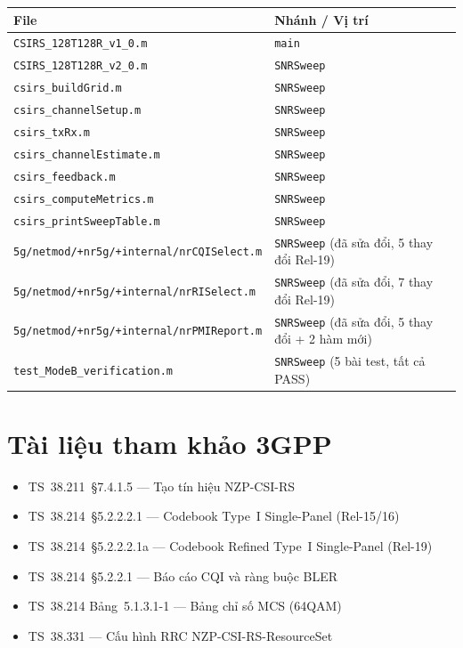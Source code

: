 \documentclass[11pt,a4paper]{article}
\begin{document}
\begin{tabular}{ll}
\toprule
\textbf{File} & \textbf{Nhánh / Vị trí} \\
\midrule
\texttt{CSIRS\_128T128R\_v1\_0.m}              & \texttt{main} \\
\texttt{CSIRS\_128T128R\_v2\_0.m}              & \texttt{SNRSweep} \\
\texttt{csirs\_buildGrid.m}                    & \texttt{SNRSweep} \\
\texttt{csirs\_channelSetup.m}                 & \texttt{SNRSweep} \\
\texttt{csirs\_txRx.m}                         & \texttt{SNRSweep} \\
\texttt{csirs\_channelEstimate.m}              & \texttt{SNRSweep} \\
\texttt{csirs\_feedback.m}                     & \texttt{SNRSweep} \\
\texttt{csirs\_computeMetrics.m}               & \texttt{SNRSweep} \\
\texttt{csirs\_printSweepTable.m}              & \texttt{SNRSweep} \\
\texttt{5g/netmod/+nr5g/+internal/nrCQISelect.m} & \texttt{SNRSweep} (đã sửa đổi, 5 thay đổi Rel-19) \\
\texttt{5g/netmod/+nr5g/+internal/nrRISelect.m} & \texttt{SNRSweep} (đã sửa đổi, 7 thay đổi Rel-19) \\
\texttt{5g/netmod/+nr5g/+internal/nrPMIReport.m} & \texttt{SNRSweep} (đã sửa đổi, 5 thay đổi + 2 hàm mới) \\
\texttt{test\_ModeB\_verification.m} & \texttt{SNRSweep} (5 bài test, tất cả PASS) \\
\bottomrule
\end{tabular}

\section{Tài liệu tham khảo 3GPP}

\begin{itemize}[noitemsep]
    \item TS~38.211~§7.4.1.5 --- Tạo tín hiệu NZP-CSI-RS
    \item TS~38.214~§5.2.2.2.1 --- Codebook Type~I Single-Panel (Rel-15/16)
    \item TS~38.214~§5.2.2.2.1a --- Codebook Refined Type~I Single-Panel (Rel-19)
    \item TS~38.214~§5.2.2.1 --- Báo cáo CQI và ràng buộc BLER
    \item TS~38.214 Bảng~5.1.3.1-1 --- Bảng chỉ số MCS (64QAM)
    \item TS~38.331 --- Cấu hình RRC NZP-CSI-RS-ResourceSet
\end{itemize}
\end{document}
